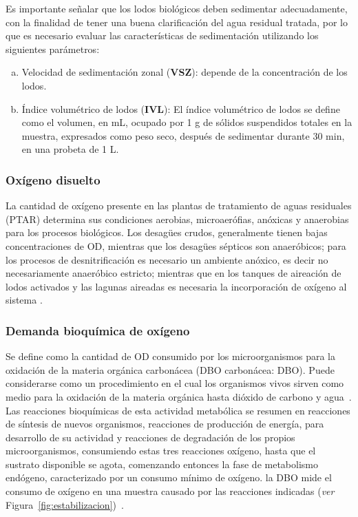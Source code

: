 Es importante señalar que los lodos biológicos deben sedimentar adecuadamente, con la finalidad de tener una buena clarificación del agua residual tratada, por lo que es necesario evaluar las características de sedimentación utilizando los siguientes parámetros:
	\begin{small}
	\begin{enumerate}[a)]
		\item Velocidad de sedimentación zonal (\textbf{VSZ}): depende de la concentración de los lodos.
		\item Índice volumétrico de lodos (\textbf{IVL}): El índice volumétrico de lodos se define como el volumen, en mL, ocupado por 1 g de sólidos suspendidos totales en la muestra, expresados como peso seco, después de sedimentar durante 30 min, en una probeta de 1 L.
	\end{enumerate}
	\end{small}
\subsubsection*{Oxígeno disuelto}
La cantidad de oxígeno presente en las plantas de tratamiento de aguas residuales (PTAR) determina sus condiciones aerobias, microaerófias, anóxicas y anaerobias para los procesos biológicos. Los desagües crudos, generalmente tienen bajas concentraciones de OD, mientras que los desagües sépticos son anaeróbicos; para los procesos de desnitrificación es necesario un ambiente anóxico, es decir no necesariamente anaeróbico estricto; mientras que en los tanques de aireación de lodos activados y las lagunas aireadas es necesaria la incorporación de oxígeno al sistema \emph{\citep{carreno17}}.
\subsubsection*{Demanda bioquímica de oxígeno}
Se define como la cantidad de OD consumido por los microorganismos para la oxidación de la materia orgánica carbonácea (DBO carbonácea: DBO). Puede considerarse como un procedimiento en el cual los organismos vivos sirven como medio para la oxidación de la materia orgánica hasta dióxido de carbono y agua~\emph{\citep{carreno17}}.\\
Las reacciones bioquímicas de esta actividad metabólica se resumen en reacciones de síntesis de nuevos organismos, reacciones de producción de energía, para desarrollo de su actividad y reacciones de degradación de los propios microorganismos, consumiendo estas tres reacciones oxígeno, hasta que el sustrato disponible se agota, comenzando entonces la fase de metabolismo endógeno, caracterizado por un consumo mínimo de oxígeno. la DBO mide el consumo de oxígeno en una muestra causado por las reacciones indicadas (\emph{ver} Figura~\ref{fig:estabilizacion})~\emph{\citep{manuel13}}.
